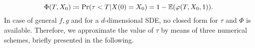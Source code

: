 \begin{equation}\label{eq:ExitProb}
	\Phi(T,X_0) \coloneqq \Pr(\tau < T | X(0) = X_0) = 1 - \mathbb{E}(\varphi(T,X_0,1)). 
\end{equation}
In case of general $f,g$ and for a $d$-dimensional SDE, no closed form for $\tau$ and $\Phi$ is available. Therefore, we approximate the value of $\tau$ by means of three numerical schemes, briefly presented in the following.





